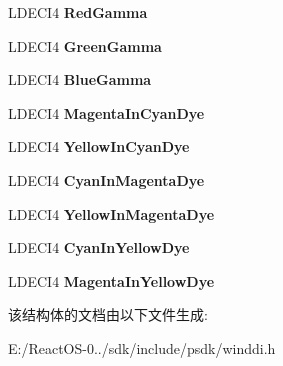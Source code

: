 \begin{DoxyCompactItemize}
\mbox{\label{struct___c_o_l_o_r_i_n_f_o_acd99d6968036b7e066dec80d83a3fcf1}} 
L\+D\+E\+C\+I4 {\bfseries Red\+Gamma}
\item 
\mbox{\label{struct___c_o_l_o_r_i_n_f_o_a2c13327e99b08d0d40dbaf4644652e2d}} 
L\+D\+E\+C\+I4 {\bfseries Green\+Gamma}
\item 
\mbox{\label{struct___c_o_l_o_r_i_n_f_o_ac35c56345d90af2016df54375bbdda3e}} 
L\+D\+E\+C\+I4 {\bfseries Blue\+Gamma}
\item 
\mbox{\label{struct___c_o_l_o_r_i_n_f_o_a2cb0bf2b60d359069fd1fd38bf236c75}} 
L\+D\+E\+C\+I4 {\bfseries Magenta\+In\+Cyan\+Dye}
\item 
\mbox{\label{struct___c_o_l_o_r_i_n_f_o_a4edac2776a56a8e531f4115a4a69101a}} 
L\+D\+E\+C\+I4 {\bfseries Yellow\+In\+Cyan\+Dye}
\item 
\mbox{\label{struct___c_o_l_o_r_i_n_f_o_a5431b16685f04a76a33085e7f5ca8560}} 
L\+D\+E\+C\+I4 {\bfseries Cyan\+In\+Magenta\+Dye}
\item 
\mbox{\label{struct___c_o_l_o_r_i_n_f_o_a6e438ba27c62bb5db58f1d45d320507f}} 
L\+D\+E\+C\+I4 {\bfseries Yellow\+In\+Magenta\+Dye}
\item 
\mbox{\label{struct___c_o_l_o_r_i_n_f_o_a56c21b964e1e4379b97f1b4d19f1ae03}} 
L\+D\+E\+C\+I4 {\bfseries Cyan\+In\+Yellow\+Dye}
\item 
\mbox{\label{struct___c_o_l_o_r_i_n_f_o_a76c8d6128e5a6e35e7577dd30a2358ec}} 
L\+D\+E\+C\+I4 {\bfseries Magenta\+In\+Yellow\+Dye}
\end{DoxyCompactItemize}


该结构体的文档由以下文件生成\+:\begin{DoxyCompactItemize}
\item 
E\+:/\+React\+O\+S-\/0../sdk/include/psdk/winddi.\+h\end{DoxyCompactItemize}
